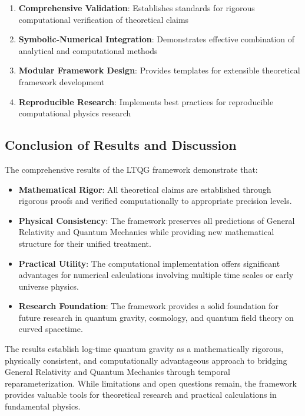 \begin{enumerate}
\item \textbf{Comprehensive Validation}: Establishes standards for rigorous computational verification of theoretical claims
\item \textbf{Symbolic-Numerical Integration}: Demonstrates effective combination of analytical and computational methods
\item \textbf{Modular Framework Design}: Provides templates for extensible theoretical framework development
\item \textbf{Reproducible Research}: Implements best practices for reproducible computational physics research
\end{enumerate}

\subsection{Conclusion of Results and Discussion}

The comprehensive results of the LTQG framework demonstrate that:

\begin{itemize}
\item \textbf{Mathematical Rigor}: All theoretical claims are established through rigorous proofs and verified computationally to appropriate precision levels.

\item \textbf{Physical Consistency}: The framework preserves all predictions of General Relativity and Quantum Mechanics while providing new mathematical structure for their unified treatment.

\item \textbf{Practical Utility}: The computational implementation offers significant advantages for numerical calculations involving multiple time scales or early universe physics.

\item \textbf{Research Foundation}: The framework provides a solid foundation for future research in quantum gravity, cosmology, and quantum field theory on curved spacetime.
\end{itemize}

The results establish log-time quantum gravity as a mathematically rigorous, physically consistent, and computationally advantageous approach to bridging General Relativity and Quantum Mechanics through temporal reparameterization. While limitations and open questions remain, the framework provides valuable tools for theoretical research and practical calculations in fundamental physics.